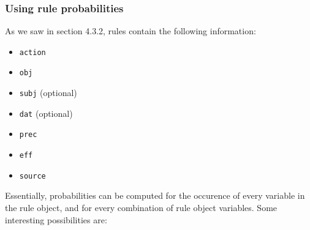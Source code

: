 \subsubsection{Using rule probabilities}

As we saw in section 4.3.2, rules contain the following information:
\begin{itemize}
\item \texttt{action}
\item \texttt{obj}
\item \texttt{subj} (optional)
\item \texttt{dat} (optional)
\item \texttt{prec}
\item \texttt{eff}
\item \texttt{source}
\end{itemize}

Essentially, probabilities can be computed for the occurence of every variable
in the rule object, and for every combination of rule object variables. Some
interesting possibilities are:

